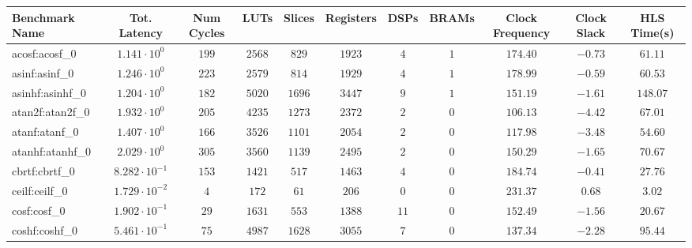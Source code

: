 \begin{tabular}{|l|c|c|c|c|c|c|c|c|c|c|}
\hline
Benchmark Name               & Tot. Latency            & Num Cycles & LUTs      & Slices    & Registers & DSPs    & BRAMs   & Clock Frequency & Clock Slack & HLS Time(s) \\
\hline
acosf:acosf\_0               & $ 1.141 \cdot 10^{0}  $ & $ 199    $ & $ 2568  $ & $ 829   $ & $ 1923  $ & $ 4   $ & $ 1   $ & $ 174.40      $ & $ -0.73   $ & $ 61.11   $ \\
asinf:asinf\_0               & $ 1.246 \cdot 10^{0}  $ & $ 223    $ & $ 2579  $ & $ 814   $ & $ 1929  $ & $ 4   $ & $ 1   $ & $ 178.99      $ & $ -0.59   $ & $ 60.53   $ \\
asinhf:asinhf\_0             & $ 1.204 \cdot 10^{0}  $ & $ 182    $ & $ 5020  $ & $ 1696  $ & $ 3447  $ & $ 9   $ & $ 1   $ & $ 151.19      $ & $ -1.61   $ & $ 148.07  $ \\
atan2f:atan2f\_0             & $ 1.932 \cdot 10^{0}  $ & $ 205    $ & $ 4235  $ & $ 1273  $ & $ 2372  $ & $ 2   $ & $ 0   $ & $ 106.13      $ & $ -4.42   $ & $ 67.01   $ \\
atanf:atanf\_0               & $ 1.407 \cdot 10^{0}  $ & $ 166    $ & $ 3526  $ & $ 1101  $ & $ 2054  $ & $ 2   $ & $ 0   $ & $ 117.98      $ & $ -3.48   $ & $ 54.60   $ \\
atanhf:atanhf\_0             & $ 2.029 \cdot 10^{0}  $ & $ 305    $ & $ 3560  $ & $ 1139  $ & $ 2495  $ & $ 2   $ & $ 0   $ & $ 150.29      $ & $ -1.65   $ & $ 70.67   $ \\
cbrtf:cbrtf\_0               & $ 8.282 \cdot 10^{-1} $ & $ 153    $ & $ 1421  $ & $ 517   $ & $ 1463  $ & $ 4   $ & $ 0   $ & $ 184.74      $ & $ -0.41   $ & $ 27.76   $ \\
ceilf:ceilf\_0               & $ 1.729 \cdot 10^{-2} $ & $ 4      $ & $ 172   $ & $ 61    $ & $ 206   $ & $ 0   $ & $ 0   $ & $ 231.37      $ & $ 0.68    $ & $ 3.02    $ \\
cosf:cosf\_0                 & $ 1.902 \cdot 10^{-1} $ & $ 29     $ & $ 1631  $ & $ 553   $ & $ 1388  $ & $ 11  $ & $ 0   $ & $ 152.49      $ & $ -1.56   $ & $ 20.67   $ \\
coshf:coshf\_0               & $ 5.461 \cdot 10^{-1} $ & $ 75     $ & $ 4987  $ & $ 1628  $ & $ 3055  $ & $ 7   $ & $ 0   $ & $ 137.34      $ & $ -2.28   $ & $ 95.44   $ \\

\end{tabular}
